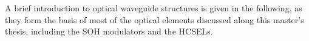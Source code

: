 A brief introduction to optical waveguide structures is given in the following, as they form the basis of most of the optical elements discussed along this master's thesis, including the SOH modulators and the HCSELs. 
